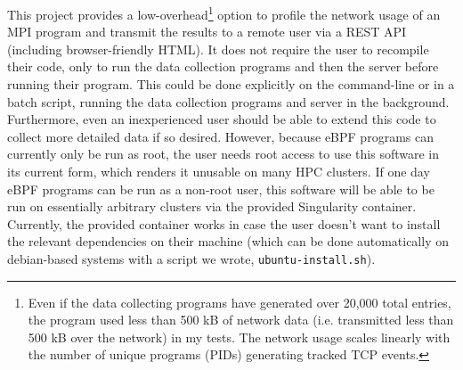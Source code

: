 
This project provides a low-overhead\footnote{Even if the data collecting programs have generated over 20,000 total entries, the program used less than 500 kB of network data (i.e. transmitted less than 500 kB over the network) in my tests. The network usage scales linearly with the number of unique programs (PIDs) generating tracked TCP events.} option to profile the network usage of an MPI program and transmit the results to a remote user via a REST API (including browser-friendly HTML). It does not require the user to recompile their code, only to run the data collection programs and then the server before running their program. This could be done explicitly on the command-line or in a batch script, running the data collection programs and server in the background. Furthermore, even an inexperienced user should be able to extend this code to collect more detailed data if so desired. However, because eBPF programs can currently only be run as root, the user needs root access to use this software in its current form, which renders it unusable on many HPC clusters. If one day eBPF programs can be run as a non-root user, this software will be able to be run on essentially arbitrary clusters via the provided Singularity container. Currently, the provided container works in case the user doesn't want to install the relevant dependencies on their machine (which can be done automatically on debian-based systems with a script we wrote, \lstinline{ubuntu-install.sh}). 
